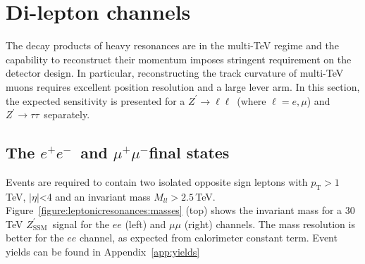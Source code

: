 \documentclass[a4paper,11pt]{article}
\newcommand{\CH}[1] {\textbf{\textcolor{blue}{CH - #1}}}
\newcommand{\Zp}{\ensuremath{Z^{\prime}}}
\newcommand{\ZpSSM}{\ensuremath{Z^{\prime}_{\mathrm{SSM}}}}
\newcommand{\Z}{\ensuremath{Z}}
\newcommand*{\Zptata}{\ensuremath{Z^{\prime}\rightarrow \tau\tau}}
\newcommand*{\Zpll}{\ensuremath{Z^{\prime}\rightarrow \ell\ell}}
\newcommand{\pt}{\ensuremath{p_{\text{T}}}}
\newcommand{\mll}{\ensuremath{M_{\ensuremath{ll}}}}
\newcommand*{\ee}{\ensuremath{e^{+}e^{-}}}
\newcommand*{\mumu}{\ensuremath{\mu^{+}\mu^{-}}}
\begin{document}
\section{Di-lepton channels}
\label{sec:lep}


The decay products of heavy resonances are in the multi-TeV regime and the capability to reconstruct their momentum imposes stringent requirement on the detector design. In particular, reconstructing the track curvature of multi-TeV muons requires excellent position resolution and a large lever arm. In this section, the expected sensitivity is presented for a \Zpll\ (where $\ell=e,\mu$) and \Zptata\ separately.

\subsection{The \ee\ and \mumu final states}
\label{sec:lepee}

Events are required to contain two isolated opposite sign leptons with $\pt > 1$\,TeV, $|\eta|$<4 and an invariant mass $\mll > 2.5$\,TeV.
Figure~\ref{figure:leptonicresonances:masses} (top) shows the invariant mass for a 30\,TeV \ZpSSM\ signal for the $ee$ (left) and $\mu\mu$ (right) channels. The mass resolution is better for the $ee$ channel, as expected from calorimeter constant term. Event yields can be found in Appendix~\ref{app:yields}
\end{document}
